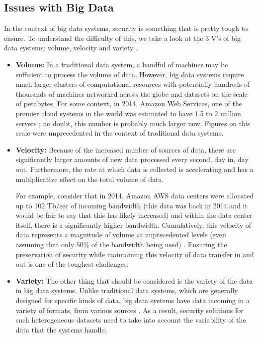 \documentclass{sigchi}
\begin{document}
\subsection{Issues with Big Data}
In the context of big data systems, security is something that is pretty tough to ensure. To understand the difficulty of this, we take a look at the 3 V's of big data systems: volume, velocity and variety \cite{gewirtz_2016} \cite{haughngibilisco_2014}.
\begin{itemize}

\item \textbf{Volume:} In a traditional data system, a handful of machines may be sufficient to process the volume of data. However, big data systems require much larger clusters of computational resources with potentially hundreds of thousands of machines networked across the globe and datasets on the scale of petabytes. For some context, in 2014, Amazon Web Services, one of the premier cloud systems in the world was estimated to have 1.5 to 2 million servers \cite{clark_2016}; no doubt, this number is probably much larger now. Figures on this scale were unprecedented in the context of traditional data systems.

\item \textbf{Velocity:} Because of the increased number of sources of data, there are significantly larger amounts of new data processed every second, day in, day out. Furthermore, the rate at which data is collected is accelerating and has a multiplicative effect on the total volume of data.

For example, consider that in 2014, Amazon AWS data centers were allocated up to 102 Tb/sec of incoming bandwidth (this data was back in 2014 and it would be fair to say that this has likely increased) and within the data center itself, there is a significantly higher bandwidth. Cumulatively, this velocity of data represents a magnitude of volume at unprecedented levels (even assuming that only 50\% of the bandwidth being used) \cite{morgan_2014}. Ensuring the preservation of security while maintaining this velocity of data transfer in and out is one of the toughest challenges.

\item \textbf{Variety:} The other thing that should be considered is the variety of the data in big data systems. Unlike traditional data systems, which are generally designed for specific kinds of data, big data systems have data incoming in a variety of formats, from various sources \cite{haughngibilisco_2014}. As a result, security solutions for such heterogeneous datasets need to take into account the variability of the data that the systems handle.
\end{itemize}
\end{document}
